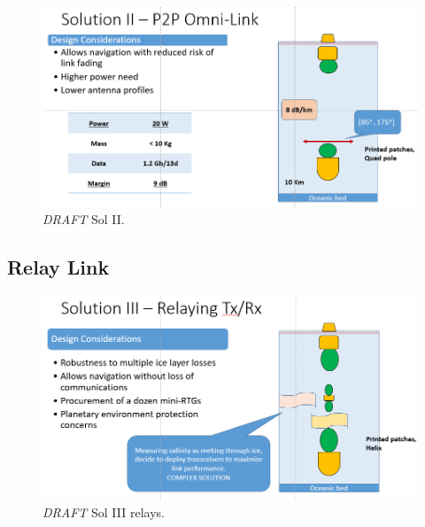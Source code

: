 \begin{figure}[htb]
	\centering
	\includegraphics[width=\textwidth]{figures/comms/iceLink-p2p-LowD}
	\caption{ \textit{DRAFT} Sol II.}
	\label{fig:iceLink-p2p-LowD}
\end{figure}

\subsection{Relay Link}
\begin{figure}[htb]
	\centering
	\includegraphics[width=\textwidth]{figures/comms/iceLink-relay}
	\caption{ \textit{DRAFT} Sol III relays.}
	\label{fig:iceLink-relay}
\end{figure}
